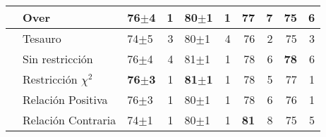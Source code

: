 \begin{table}[ht]
\begin{center}
{\begin{tabular}{lllrlrrrrr}
                           & \cellcolor[HTML]{EFEFEF}Over            & \cellcolor[HTML]{EFEFEF}76$\pm$4 & \cellcolor[HTML]{EFEFEF}1                     & \cellcolor[HTML]{EFEFEF}80$\pm$1          & \cellcolor[HTML]{EFEFEF}1                     & \cellcolor[HTML]{EFEFEF}77          & \cellcolor[HTML]{EFEFEF}7                     & \cellcolor[HTML]{EFEFEF}75          & \cellcolor[HTML]{EFEFEF}6                     \\ \hline
                           & \cellcolor[HTML]{EFEFEF}Tesauro         & \cellcolor[HTML]{EFEFEF}74$\pm$5 & \cellcolor[HTML]{EFEFEF}3                     & \cellcolor[HTML]{EFEFEF}80$\pm$1          & \cellcolor[HTML]{EFEFEF}4                     & \cellcolor[HTML]{EFEFEF}76          & \cellcolor[HTML]{EFEFEF}2                     & \cellcolor[HTML]{EFEFEF}75          & \cellcolor[HTML]{EFEFEF}3                     \\ \hline
                           & \cellcolor[HTML]{EFEFEF}Sin restricción & \cellcolor[HTML]{EFEFEF}76$\pm$4          & \cellcolor[HTML]{EFEFEF}4                     & \cellcolor[HTML]{EFEFEF}81$\pm$1          & \cellcolor[HTML]{EFEFEF}1                     & \cellcolor[HTML]{EFEFEF}78          & \cellcolor[HTML]{EFEFEF}6                     & \cellcolor[HTML]{EFEFEF}\textbf{78 }& \cellcolor[HTML]{EFEFEF}6                     \\ \hline
                           & Restricción $\chi^2$                         & \textbf{76$\pm$3}                                  & 1                                             & \textbf{81$\pm$1}                         & 1                                             & 78                                  & 5                                             & 77                                  & 1                                             \\ \hline
                           & Relación Positiva                       & 76$\pm$3                                  & 1                                             & 80$\pm$1                         & 1                                             & 78                                  & 6                                             & 76                                  & 1                                             \\ \hline
                           & Relación Contraria                      & 74$\pm$1                                  & 1                                             & 80$\pm$1                                  & 1                                             & \textbf{81}                         & 8                                             & 75                                  & 5                                             \\ \hline
\end{tabular}%

}
\end{center}
\end{table}